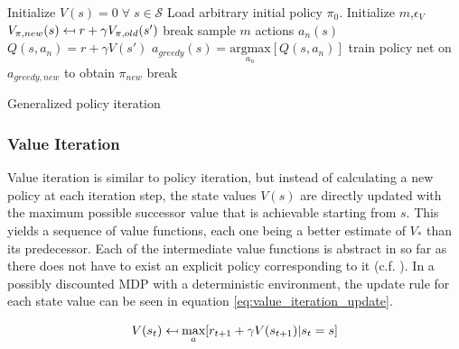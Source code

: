 \begin{algorithm}[hbt]
	\begin{algorithmic}[0] %
		\State Initialize $V(s) = 0 \; \forall \; s \in \mathcal{S}$
		\State Load arbitrary initial policy $\pi_0$.
		\State Initialize $m$,\;$\epsilon_V$
		\State $V_{\pi,new}(s) \mathrel{\reflectbox{\ensuremath{\mapsto}}} r+\gamma V_ {\pi,old}(s')$
		\EndFor
		\State break
		\EndIf
		\EndWhile
		\EndFunction
		\State sample $m$ actions $a_n(s)$
		\State $Q(s,a_n) = r + \gamma V(s')$
		\EndFor
		\State $a_{greedy}(s)=\underset{a_n}{\text{argmax}}[Q(s,a_n)]$
		\EndFor
		\EndFunction
		\State train policy net on $a_{greedy,new}$ to obtain $\pi_{new}$
		\State break
		\EndIf
		
		\EndWhile

		\EndFunction
	\end{algorithmic}
	\caption{Generalized policy iteration}
	\label{algo:gpi}
\end{algorithm}

\subsubsection{Value Iteration}
\label{subsection:VI}
Value iteration is similar to policy iteration, but instead of calculating a new policy at each iteration step, the state values $V(s)$ are directly updated with the maximum possible successor value that is achievable starting from $s$. This yields a sequence of value functions, each one being a better estimate of $V_*$ than its predecessor. Each of the intermediate value functions is abstract in so far as there does not have to exist an explicit policy corresponding to it (c.f. \cite[lecture~3]{Silver2015}). In a possibly discounted MDP with a deterministic environment, the update rule for each state value can be seen in equation \ref{eq:value_iteration_update}.

\begin{equation}
V(s_t) \mathrel{\reflectbox{\ensuremath{\mapsto}}} 
\underset{a}{\text{max}}[r_{t+1}+\gamma V(s_{t+1})|s_t=s]
\label{eq:value_iteration_update}
\end{equation}

